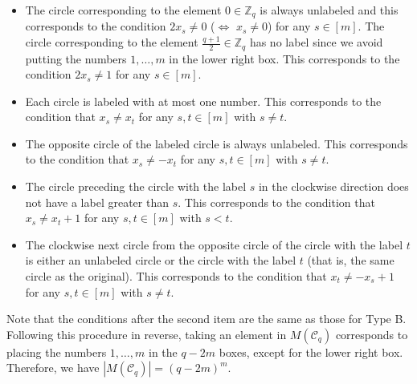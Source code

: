 \documentclass{article}
\theoremstyle{plain}
\theoremstyle{definition}
\theoremstyle{remark}
\numberwithin{equation}{section}
\newcommand{\Cc}{\mathcal{C}}
\begin{document}
\begin{itemize}
\item The circle corresponding to the element $0\in\mathbb{Z}_q$ is always unlabeled and this corresponds to the condition $2x_s\neq 0$ ($\Leftrightarrow$ $x_s\neq 0$) for any $s\in [m]$.
The circle corresponding to the element $\displaystyle \frac{q+1}{2}\in\mathbb{Z}_q$ has no label since we avoid putting the numbers $1,\dots,m$ in the lower right box.
This corresponds to the condition $2x_s\neq 1$ for any $s\in [m]$.
\item Each circle is labeled with at most one number.
This corresponds to the condition that $x_s\neq x_t$ for any $s,t\in [m]$ with $s\neq t$.
\item The opposite circle of the labeled circle is always unlabeled.
This corresponds to the condition that $x_s\neq -x_t$ for any $s,t\in [m]$ with $s\neq t$.
\item The circle preceding the circle with the label $s$ in the clockwise direction does not have a label greater than $s$.
This corresponds to the condition that $x_s\neq x_t+1$ for any $s,t\in [m]$ with $s<t$.
\item The clockwise next circle from the opposite circle of the circle with the label $t$ is either an unlabeled circle or the circle with the label $t$ (that is, the same circle as the original).
This corresponds to the condition that $x_t\neq -x_s+1$ for any $s,t\in [m]$ with $s\neq t$.
\end{itemize}
Note that the conditions after the second item are the same as those for Type B.
Following this procedure in reverse, taking an element in $M(\Cc_q)$ corresponds to placing the numbers $1,\dots,m$ in the $q-2m$ boxes, except for the lower right box.
Therefore, we have $|M(\Cc_q)|=(q-2m)^m$.
\end{document}
